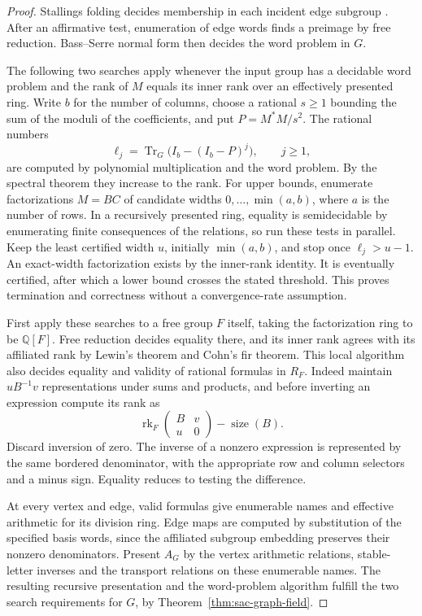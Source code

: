 \documentclass[11pt,a4paper,reqno]{amsart}
\numberwithin{equation}{section}
\theoremstyle{remark}
\newcommand{\Q}{\mathbb Q}
\newcommand{\Tr}{\operatorname{Tr}}
\newcommand{\rk}{\operatorname{rk}}
\begin{document}
\begin{proof}
Stallings folding decides membership in each incident edge subgroup \cite{KapovichMyasnikov}. After an affirmative test, enumeration of edge words finds a preimage by free reduction. Bass--Serre normal form then decides the word problem in \(G\).

The following two searches apply whenever the input group has a decidable word problem and the rank of \(M\) equals its inner rank over an effectively presented ring. Write \(b\) for the number of columns, choose a rational \(s\ge1\) bounding the sum of the moduli of the coefficients, and put \(P=M^*M/s^2\). The rational numbers
\[
 \ell_j=\Tr_G\bigl(I_b-(I_b-P)^j\bigr),\qquad j\ge1,
\]
are computed by polynomial multiplication and the word problem. By the spectral theorem they increase to the rank. For upper bounds, enumerate factorizations \(M=BC\) of candidate widths \(0,\ldots,\min(a,b)\), where \(a\) is the number of rows. In a recursively presented ring, equality is semidecidable by enumerating finite consequences of the relations, so run these tests in parallel. Keep the least certified width \(u\), initially \(\min(a,b)\), and stop once \(\ell_j>u-1\). An exact-width factorization exists by the inner-rank identity. It is eventually certified, after which a lower bound crosses the stated threshold. This proves termination and correctness without a convergence-rate assumption.

First apply these searches to a free group \(F\) itself, taking the factorization ring to be \(\Q[F]\). Free reduction decides equality there, and its inner rank agrees with its affiliated rank by Lewin's theorem and Cohn's fir theorem. This local algorithm also decides equality and validity of rational formulas in \(R_F\). Indeed maintain \(uB^{-1}v\) representations under sums and products, and before inverting an expression compute its rank as
\[
 \rk_F\begin{pmatrix}B&v\\u&0\end{pmatrix}-\operatorname{size}(B).
\]
Discard inversion of zero. The inverse of a nonzero expression is represented by the same bordered denominator, with the appropriate row and column selectors and a minus sign. Equality reduces to testing the difference.

At every vertex and edge, valid formulas give enumerable names and effective arithmetic for its division ring. Edge maps are computed by substitution of the specified basis words, since the affiliated subgroup embedding preserves their nonzero denominators. Present \(A_G\) by the vertex arithmetic relations, stable-letter inverses and the transport relations on these enumerable names. The resulting recursive presentation and the word-problem algorithm fulfill the two search requirements for \(G\), by Theorem~\ref{thm:sac-graph-field}.
\end{proof}
\end{document}
